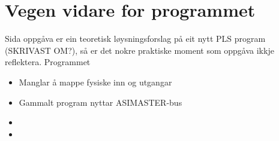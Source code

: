 \section{Vegen vidare for programmet}
\thispagestyle{fancy}


Sida oppgåva er ein teoretisk løysningsforslag på eit nytt PLS program (SKRIVAST OM?), så er det nokre praktiske moment som oppgåva ikkje reflektera.
Programmet 


\begin{itemize}
    \item Manglar å mappe fysiske inn og utgangar
    \item Gammalt program nyttar ASIMASTER-bus
    \item 
    \item   
\end{itemize}